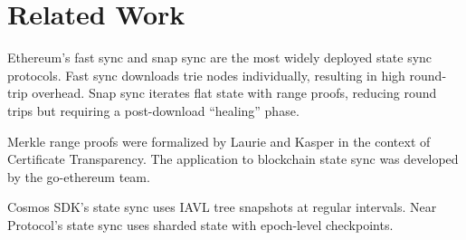 \section{Related Work}
\label{sec:related}

Ethereum's fast sync \cite{ethfastSync} and snap sync \cite{ethsnapSync} are the most widely deployed state sync protocols. Fast sync downloads trie nodes individually, resulting in high round-trip overhead. Snap sync iterates flat state with range proofs, reducing round trips but requiring a post-download ``healing'' phase.

Merkle range proofs were formalized by Laurie and Kasper \cite{laurie2013revocation} in the context of Certificate Transparency. The application to blockchain state sync was developed by the go-ethereum team.

Cosmos SDK's state sync \cite{cosmosStateSync} uses IAVL tree snapshots at regular intervals. Near Protocol's state sync \cite{nearStateSync} uses sharded state with epoch-level checkpoints.

